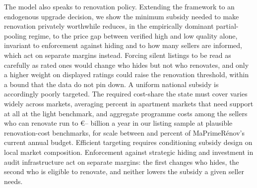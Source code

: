 The model also speaks to renovation policy. Extending the framework to an endogenous upgrade
decision, we show the minimum subsidy needed to make renovation privately worthwhile reduces, in
the empirically dominant partial-pooling regime, to the price gap between verified high and low
quality alone, invariant to enforcement against hiding and to how many sellers are informed,
which act on separate margins instead. Forcing silent listings to be read as carefully as rated ones would change who hides but not who renovates, and only a higher weight on displayed ratings could raise the renovation threshold, within a bound that the data do not pin down. %
A uniform national subsidy is accordingly poorly targeted. The
required cost-share the state must cover varies widely across
markets, averaging \attBaseCostShareTwoFiftyApt{} percent in apartment markets that need support at all at the light benchmark, and aggregate programme costs among the sellers who can renovate run to
\euro{}\attScCostBaseTotTwoFifty{}--\attScCostBaseTotFiveHundred{} billion a year in our listing sample at plausible renovation-cost benchmarks, for scale between \attScCostBaseTotTwoFiftyLo{} and
\attScCostBaseTotFiveHundredHi{} percent of MaPrimeR\'enov's current annual budget. Efficient targeting requires conditioning subsidy design
on local market composition. Enforcement against strategic hiding and investment in audit
infrastructure act on separate margins: the first changes who hides, the second who is eligible to renovate, and neither lowers the subsidy a given seller needs.
